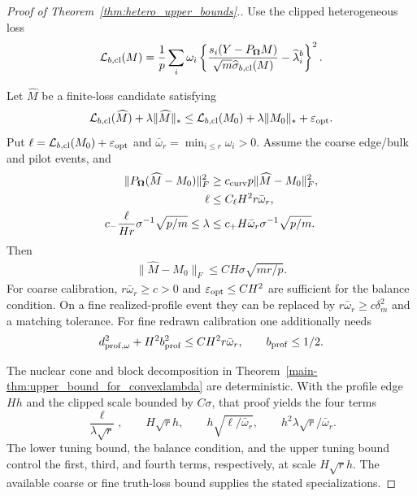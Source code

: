 \documentclass[numsec,webpdf,modern,large,namedate]{oup-authoring-template}
\theoremstyle{plain}
\theoremstyle{remark}
\newcommand{\bOmega}{\bm{\Omega}}
\newif\ifmarkchanges
\newenvironment{revision}{\begingroup\ifmarkchanges\color{red}\fi}{\endgroup}
\begin{document}
\begin{revision}
\begin{proof}[Proof of Theorem~\ref{thm:hetero_upper_bounds}.]
Use the clipped heterogeneous loss
\begin{align}
 \mathcal L_{b,\rm cl}(M)=\frac1p\sum_i\omega_i
 \left\{\frac{s_i(Y-P_{\bOmega}M)}{\sqrt m\widehat\sigma_{b,\rm cl}(M)}
                    -\widehat\lambda_i^b\right\}^2.
 \label{eq:vp_clipped_loss}
\end{align}

Let $\widehat{M}$ be a finite-loss candidate satisfying
\[
 \mathcal L_{b,\rm cl}(\widehat{M})+\lambda\|\widehat{M}\|_*
 \le\mathcal L_{b,\rm cl}(M_0)+\lambda\|M_0\|_*+\varepsilon_{\rm opt}.
\]
Put $\ell=\mathcal L_{b,\rm cl}(M_0)+\varepsilon_{\rm opt}$ and
$\bar\omega_r=\min_{i\le r}\omega_i>0$.  Assume the coarse edge/bulk
and pilot events, and
\begin{align}
 \|P_{\bOmega}(\widehat{M}-M_0)\|_F^2
 &\ge c_{\rm curv}p\|\widehat{M}-M_0\|_F^2,
 \label{eq:vp_nuclear_localization}\\
 \ell&\le C_\ell H^2r\bar\omega_r,
 \label{eq:vp_nuclear_balance}\\
 c_-\frac{\ell}{Hr}\sigma^{-1}\sqrt{p/m}
 \le\lambda&\le c_+H\bar\omega_r\sigma^{-1}\sqrt{p/m}.
 \label{eq:vp_nuclear_tuning}
\end{align}
Then
\begin{align}
 \|\widehat{M}-M_0\|_F\le CH\sigma\sqrt{mr/p}.
 \label{eq:vp_nuclear_rate}
\end{align}
For coarse calibration, $r\bar\omega_r\ge c>0$ and
$\varepsilon_{\rm opt}\le CH^2$ are sufficient for the balance condition.
On a fine realized-profile event they can be replaced by
$r\bar\omega_r\ge c\delta_m^2$ and a matching tolerance.
For fine redrawn calibration one additionally needs
\begin{align}
 d_{\rm prof,\omega}^2+H^2b_{\rm prof}^2
            \le CH^2r\bar\omega_r,\qquad b_{\rm prof}\le1/2.
 \label{eq:vp_nuclear_redraw_condition}
\end{align}

The nuclear cone and block decomposition in
Theorem~\ref{main-thm:upper_bound_for_convexlambda} are deterministic.
With the profile edge $Hh$ and the clipped scale bounded by $C\sigma$,
that proof yields the four terms
\[
 \frac{\ell}{\lambda\sqrt r},\qquad
 H\sqrt r h,\qquad h\sqrt{\ell/\bar\omega_r},\qquad
 h^2\lambda\sqrt r/\bar\omega_r.
\]
The lower tuning bound, the balance condition, and the upper tuning bound
control the first, third, and fourth terms, respectively, at scale
$H\sqrt r h$.  The available coarse or fine truth-loss bound supplies
the stated specializations.  
\end{proof}



\end{revision}
\end{document}
